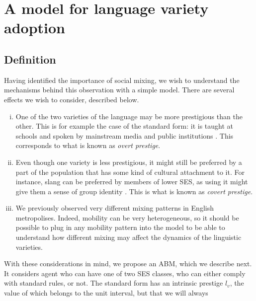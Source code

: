 \documentclass[../thesis.tex]{subfiles}
\begin{document}
\section{A model for language variety adoption}

\subsection{Definition}
Having identified the importance of social mixing, we wish to understand the mechanisms
behind this observation with a simple model.
There are several effects we wish to
consider, described below.
\begin{enumerate}[(i)]
  \item One of the two varieties of the language may be more prestigious than the other.
  This is for example the case of the standard form: it is taught at schools and spoken
  by mainstream media and public institutions \cite{DavilaInevitabilityStandard2016}.
  This corresponds to what is known as \emph{overt prestige}.
  \item Even though one variety is less prestigious, it might still be preferred by a
  part of the population that has some kind of cultural attachment to it. For instance,
  slang can be preferred by members of lower \ac{SES}, as using it might give them a
  sense of group identity
  \cite{LabovSocialStratification1966,TrudgillSocialDifferentiation1974}. This
  is what is known as \emph{covert prestige}.
  \item We previously observed very different mixing patterns in English metropolises.
  Indeed, mobility can be very heterogeneous, so it should be possible to plug in any
  mobility pattern into the model to be able to understand how different mixing may
  affect the dynamics of the linguistic varieties.
\end{enumerate}
With these considerations in mind, we propose an \ac{ABM}, which we describe next. It
considers agent who can have one of two \ac{SES} classes,
who can either comply with standard rules, or not. The standard form has an intrinsic
prestige $l_v$, the value of which belongs to the unit interval, but that we will always
\end{document}
